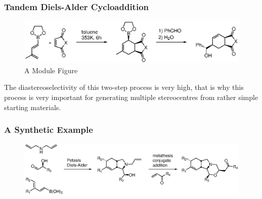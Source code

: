 \begin{frame}
	\frametitle{Tandem Diels-Alder Cycloaddition}
	\begin{figure}
		\centering
		\includegraphics[width=1.0\linewidth]{fig/tand-diels-module}
		\caption{A Module Figure}
		\label{fig:tand-diels-module}
	\end{figure}
	
	
	The diastereoselectivity of this two-step process is
	very high, that is why this process is very important for generating
	multiple stereocentres from rather simple starting materials.
	
\end{frame}

\begin{frame}
	\frametitle{A Synthetic Example}
	\begin{figure}
		\centering
		\includegraphics[width=1.0\linewidth]{fig/tand-diels-example}
		\label{fig:tand-diels-example}
	\end{figure}
	
\end{frame}